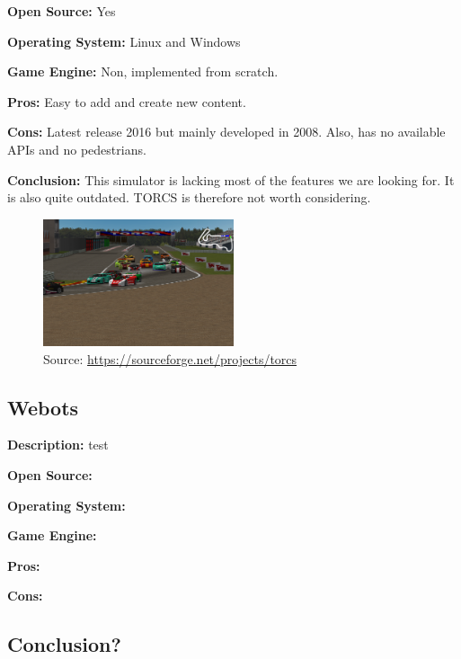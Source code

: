 \textbf{Open Source:} Yes

\textbf{Operating System:} Linux and Windows

\textbf{Game Engine:} Non, implemented from scratch.

\textbf{Pros:} Easy to add and create new content. 

\textbf{Cons:} Latest release 2016 but mainly developed in 2008. Also, has no available APIs and no pedestrians.

\textbf{Conclusion:} This simulator is lacking most of the features we are looking for. It is also quite outdated. TORCS is therefore not worth considering. 

\begin{figure}[H]
    \centering
    \includegraphics[width=0.5\textwidth]{Simulators/TORCS.png}
    \caption{Source: \url{https://sourceforge.net/projects/torcs}}
\end{figure}

\subsection{Webots}
\textbf{Description:} test

\textbf{Open Source:}

\textbf{Operating System:}

\textbf{Game Engine:}

\textbf{Pros:}

\textbf{Cons:}


\subsection{Conclusion?}
